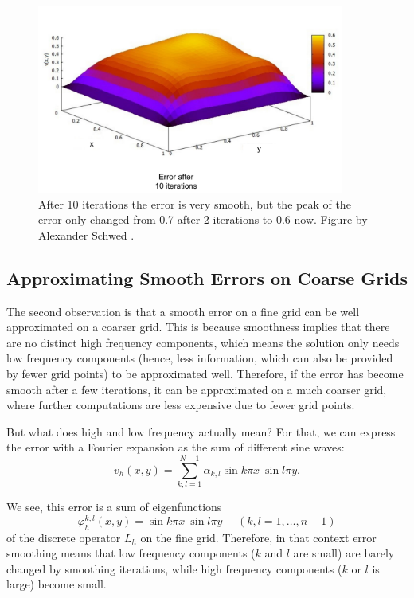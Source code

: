 \begin{figure}[tbp]
	\centering
	\includegraphics[width=0.9\textwidth]{chapters/chapter02/mg_error_smoothing_10}
	\caption{After 10 iterations the error is very smooth, but the peak of the error only changed from 0.7 after 2 iterations to 0.6 now. Figure by Alexander Schwed \cite{schwed}.}
	\label{fig:mg_error_smoothing_10}
\end{figure}


\subsection{Approximating Smooth Errors on Coarse Grids}
The second observation is that a smooth error on a fine grid can be well approximated on a coarser grid. This is because smoothness implies that there are no distinct high frequency components, which means the solution only needs low frequency components (hence, less information, which can also be provided by fewer grid points) to be approximated well. Therefore, if the error has become smooth after a few iterations, it can be approximated on a much coarser grid, where further computations are less expensive due to fewer grid points.

But what does high and low frequency actually mean? For that, we can express the error with a Fourier expansion as the sum of different sine waves:
\begin{equation}
v_h(x,y) = \sum_{k,l = 1}^{N-1} \alpha_{k,l} \sin k \pi x~ \sin l \pi y.
\end{equation}

We see, this error is a sum of eigenfunctions 
\begin{equation}
\varphi_h ^{k,l}(x,y) = \sin k \pi x~ \sin l \pi y \text{~~~~}(k,l = 1, \hdots, n-1)
\end{equation}
of the discrete operator $L_h$ on the fine grid. Therefore, in that context error smoothing means that low frequency components ($k$ and $l$ are small) are barely changed by smoothing iterations, while high frequency components ($k$ or $l$ is large) become small.

